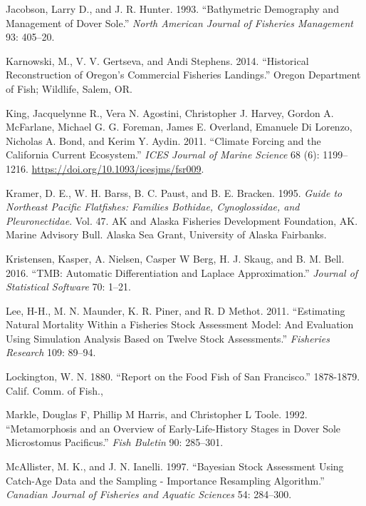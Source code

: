 \documentclass[11pt,
  english,
  a4paper,
]{article}
\begin{document}
\begin{cslreferences}
\leavevmode\hypertarget{ref-jacobson_bathymetric_1993}{}%
Jacobson, Larry D., and J. R. Hunter. 1993. ``Bathymetric Demography and Management of Dover Sole.'' \emph{North American Journal of Fisheries Management} 93: 405--20.

\leavevmode\hypertarget{ref-karnowski_historical_2014}{}%
Karnowski, M., V. V. Gertseva, and Andi Stephens. 2014. ``Historical Reconstruction of Oregon's Commercial Fisheries Landings.'' Oregon Department of Fish; Wildlife, Salem, OR.

\leavevmode\hypertarget{ref-king_climate_2011}{}%
King, Jacquelynne R., Vera N. Agostini, Christopher J. Harvey, Gordon A. McFarlane, Michael G. G. Foreman, James E. Overland, Emanuele Di Lorenzo, Nicholas A. Bond, and Kerim Y. Aydin. 2011. ``Climate Forcing and the California Current Ecosystem.'' \emph{ICES Journal of Marine Science} 68 (6): 1199--1216. \url{https://doi.org/10.1093/icesjms/fsr009}.

\leavevmode\hypertarget{ref-kramer_guide_1995}{}%
Kramer, D. E., W. H. Barss, B. C. Paust, and B. E. Bracken. 1995. \emph{Guide to Northeast Pacific Flatfishes: Families Bothidae, Cynoglossidae, and Pleuronectidae}. Vol. 47. AK and Alaska Fisheries Development Foundation, AK. Marine Advisory Bull. Alaska Sea Grant, University of Alaska Fairbanks.

\leavevmode\hypertarget{ref-kristensen_tmb:_2016}{}%
Kristensen, Kasper, A. Nielsen, Casper W Berg, H. J. Skaug, and B. M. Bell. 2016. ``TMB: Automatic Differentiation and Laplace Approximation.'' \emph{Journal of Statistical Software} 70: 1--21.

\leavevmode\hypertarget{ref-Lee_est_m_2011}{}%
Lee, H-H., M. N. Maunder, K. R. Piner, and R. D Methot. 2011. ``Estimating Natural Mortality Within a Fisheries Stock Assessment Model: And Evaluation Using Simulation Analysis Based on Twelve Stock Assessments.'' \emph{Fisheries Research} 109: 89--94.

\leavevmode\hypertarget{ref-lockington_report_1880}{}%
Lockington, W. N. 1880. ``Report on the Food Fish of San Francisco.'' 1878-1879. Calif. Comm. of Fish.,

\leavevmode\hypertarget{ref-markle_metamorphosis_1992}{}%
Markle, Douglas F, Phillip M Harris, and Christopher L Toole. 1992. ``Metamorphosis and an Overview of Early-Life-History Stages in Dover Sole Microstomus Pacificus.'' \emph{Fish Buletin} 90: 285--301.

\leavevmode\hypertarget{ref-mcallister_bayesian_1997}{}%
McAllister, M. K., and J. N. Ianelli. 1997. ``Bayesian Stock Assessment Using Catch-Age Data and the Sampling - Importance Resampling Algorithm.'' \emph{Canadian Journal of Fisheries and Aquatic Sciences} 54: 284--300.


\end{cslreferences}
\end{document}
